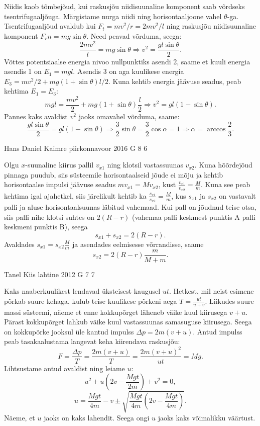 \documentclass[11pt, twoside]{article}
\begin{document}
{{\ifSolution
Niidis kaob tõmbejõud, kui raskusjõu niidisuunaline komponent saab võrdseks tsentrifugaaljõuga. Märgistame nurga niidi ning horisontaaljoone vahel $\theta$-ga. Tsentrifugaaljõud avaldub kui $F_t=mv^2/r=2mv^2/l$ ning raskusjõu niidisuunaline komponent $F_rn=mg\sin\theta$. Need peavad võrduma, seega:
$$\frac{2mv^2}{l}=mg\sin\theta \Rightarrow v^2=\frac{gl\sin\theta}{2}.$$
Võttes potentsiaalse energia nivoo nullpunktiks asendi 2, saame et kuuli energia asendis 1 on $E_1=mgl$. Asendis 3 on aga kuulikese energia $E_3=mv^2/2+mg(1+\sin\theta)l/2$. Kuna kehtib energia jäävuse seadus, peab kehtima $E_1=E_3$:
$$mgl=\frac{mv^2}{2}+mg(1+\sin\theta)\frac{l}{2} \Rightarrow v^2=gl(1-\sin\theta).$$
Pannes kaks avaldist $v^2$ jaoks omavahel võrduma, saame:
$$\frac{gl\sin\theta}{2}=gl(1-\sin\theta)\Rightarrow \frac{3}{2}\sin\theta=\frac{3}{2}\cos\alpha=1 \Rightarrow \alpha=\arccos\frac{2}{3}.$$
\fi
}

{Hans Daniel Kaimre} %
{piirkonnavoor} %
{2016} %
{G 8} %
{6} %
{

\ifSolution
Olgu $x$-suunaline kiirus pallil $v_{x1}$ ning klotsil vastassuunas $v_{x2}$. Kuna hõõrdejõud pinnaga puudub, siis süsteemile horisontaalseid jõude ei mõju ja kehtib horisontaalse impulsi jäävuse seadus $mv_{x1}=Mv_{x2}$, kust $\frac{v_{x1}}{v_{x2}}=\frac{M}{m}$. Kuna see peab kehtima igal ajahetkel, siis järelikult kehtib ka $\frac{s_{x1}}{s_{x2}}=\frac{M}{m}$, kus $s_{x1}$ ja $s_{x2}$ on vastavalt palli ja aluse horisontaalsuunas läbitud vahemaad. Kui pall on jõudnud teise otsa, siis palli nihe klotsi suhtes on $2(R-r)$ (vahemaa palli keskmest punktis A palli keskmeni punktis B), seega
\[
s_{x1}+s_{x2}=2(R-r).
\]
Avaldades $s_{x1} = s_{x2}\frac Mm$ ja asendades eelmisesse võrrandisse, saame 
$$s_{x2}=2(R-r)\frac{m}{M+m}.$$
\fi
}

{Tanel Kiis} %
{lahtine} %
{2012} %
{G 7} %
{7} %
{

\ifSolution
Kaks naaberkuulikest lendavad üksteisest kaugusel $u t$. Hetkest, mil neist esimene põrkab suure kehaga, kulub teise kuulikese põrkeni aega $T=\frac{u t}{u+v}$.
Liikudes suure massi süsteemi, näeme et enne kokkupõrget läheneb väike kuul kiirusega $v + u$. Pärast kokkupõrget lahkub väike kuul vastassuunas samasuguse kiirusega. Seega on kokkupõrke jooksul üle kantud impulss $\Delta p = 2m(v + u)$. Antud impulss peab tasakaalustama langevat keha kiirendava raskusjõu: \[ F=\frac{\Delta p}{T}=\frac{2m(v + u)}{T} = \frac{2m(v + u)^2}{ut}=Mg. \]
Lihtsustame antud avaldist ning leiame $u$:
\[
u^2 + u\left( 2v - \frac{Mgt}{2m}\right) + v^2 = 0,
\]
\[
u = \frac{Mgt}{4m} - v \pm \sqrt{\frac{Mgt}{4m}\left( 2v - \frac{Mgt}{4m}\right)}.
\]
Näeme, et $u$ jaoks on kaks lahendit. Seega ongi $u$ jaoks kaks võimalikku väärtust.
\fi
}

}
\end{document}
